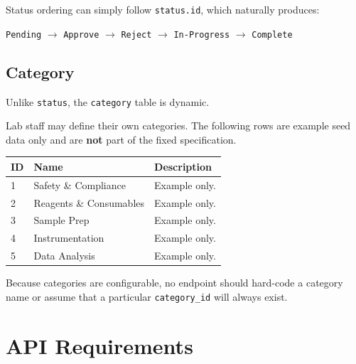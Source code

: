 \documentclass[11pt,a4paper]{article}
\begin{document}
Status ordering can simply follow \texttt{status.id}, which
naturally produces:

\begin{center}
\texttt{Pending}
$\rightarrow$
\texttt{Approve}
$\rightarrow$
\texttt{Reject}
$\rightarrow$
\texttt{In-Progress}
$\rightarrow$
\texttt{Complete}
\end{center}

\pagebreak
\subsection{Category}

Unlike \texttt{status}, the \texttt{category} table is
dynamic.

Lab staff may define their own categories. The following rows
are example seed data only and are \textbf{not} part of the
fixed specification.

\begin{longtable}{@{}p{1.4cm}p{4.4cm}p{9.96cm}@{}}
\toprule
\textbf{ID} & \textbf{Name} & \textbf{Description} \\
\midrule
\endhead

1 & Safety \& Compliance & Example only. \\
2 & Reagents \& Consumables & Example only. \\
3 & Sample Prep & Example only. \\
4 & Instrumentation & Example only. \\
5 & Data Analysis & Example only. \\

\bottomrule
\end{longtable}

Because categories are configurable, no endpoint should
hard-code a category name or assume that a particular
\texttt{category\_id} will always exist.


\clearpage
\section{API Requirements}

\begin{center}
\end{center}
\end{document}
